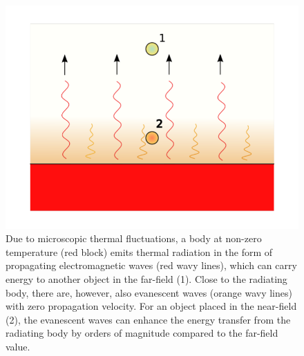 
\begin{figure}
\begin{center}
 \includegraphics[width=.80\columnwidth]{inkscape/thermal_radiation.pdf}
 \caption{Due to microscopic thermal fluctuations, a body at non-zero temperature (red block) emits thermal radiation in the form of propagating electromagnetic waves (red wavy lines), which can carry energy to another object in the far-field (1). Close to the radiating body, there are, however, also evanescent waves (orange wavy lines) with zero propagation velocity. For an object placed in the near-field (2), the evanescent waves can enhance the energy transfer from the radiating body by orders of magnitude compared to the far-field value.}
\label{fig:intro_em}
\end{center}
\end{figure}

